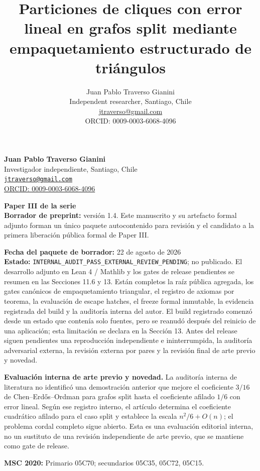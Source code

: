 \documentclass[
  spanish,
  11pt,
  a4paper,
]{article}
\title{Particiones de cliques con error lineal en grafos split mediante empaquetamiento estructurado de triángulos}
\author{Juan Pablo Traverso Gianini\\
\small Independent researcher, Santiago, Chile\\
\small \href{mailto:jtraverso@gmail.com}{jtraverso@gmail.com}\\
\small ORCID: 0009-0003-6068-4096}
\date{}
\begin{document}
\sloppy
\raggedbottom
\maketitle

\textbf{Juan Pablo Traverso Gianini}\\
Investigador independiente, Santiago, Chile\\
\href{mailto:jtraverso@gmail.com}{\nolinkurl{jtraverso@gmail.com}}\\
\href{https://orcid.org/0009-0003-6068-4096}{ORCID: 0009-0003-6068-4096}

\textbf{Paper III de la serie}\\
\textbf{Borrador de preprint:} versión 1.4. Este manuscrito y su artefacto formal adjunto forman un único paquete autocontenido para revisión y el candidato a la primera liberación pública formal de Paper III.

\textbf{Fecha del paquete de borrador:} 22 de agosto de 2026\\
\textbf{Estado:} \texttt{INTERNAL\_AUDIT\_PASS\_EXTERNAL\_REVIEW\_PENDING}; no publicado. El desarrollo adjunto en Lean 4 / Mathlib y los gates de release pendientes se resumen en las Secciones 11.6 y 13. Están completos la raíz pública agregada, los gates canónicos de empaquetamiento triangular, el registro de axiomas por teorema, la evaluación de escape hatches, el freeze formal inmutable, la evidencia registrada del build y la auditoría interna del autor. El build registrado comenzó desde un estado que contenía solo fuentes, pero se reanudó después del reinicio de una aplicación; esta limitación se declara en la Sección 13. Antes del release siguen pendientes una reproducción independiente e ininterrumpida, la auditoría adversarial externa, la revisión externa por pares y la revisión final de arte previo y novedad.

\textbf{Evaluación interna de arte previo y novedad.} La auditoría interna de literatura no identificó una demostración anterior que mejore el coeficiente \(3/16\) de Chen--Erdős--Ordman para grafos split hasta el coeficiente afilado \(1/6\) con error lineal. Según ese registro interno, el artículo determina el coeficiente cuadrático afilado para el caso split y establece la escala \(n^2/6+O(n)\); el problema cordal completo sigue abierto. Esta es una evaluación editorial interna, no un sustituto de una revisión independiente de arte previo, que se mantiene como gate de release.

\textbf{MSC 2020:} Primario 05C70; secundarios 05C35, 05C72, 05C15.
\end{document}
